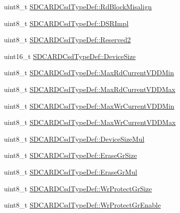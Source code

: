 \begin{DoxyCompactItemize}
\item 
uint8\-\_\-t \hyperlink{group___p_i_o_s___s_d_c_a_r_d_ga959156fe53645cd48d715f89c3407618}{\-S\-D\-C\-A\-R\-D\-Csd\-Type\-Def\-::\-Rd\-Block\-Misalign}
\item 
uint8\-\_\-t \hyperlink{group___p_i_o_s___s_d_c_a_r_d_ga650841d99b60792a21a853a6a2c541d9}{\-S\-D\-C\-A\-R\-D\-Csd\-Type\-Def\-::\-D\-S\-R\-Impl}
\item 
uint8\-\_\-t \hyperlink{group___p_i_o_s___s_d_c_a_r_d_ga2580f84971aaa12e06b546fd8b884dad}{\-S\-D\-C\-A\-R\-D\-Csd\-Type\-Def\-::\-Reserved2}
\item 
uint16\-\_\-t \hyperlink{group___p_i_o_s___s_d_c_a_r_d_ga32e9f1203e96670adc0e71599231da0f}{\-S\-D\-C\-A\-R\-D\-Csd\-Type\-Def\-::\-Device\-Size}
\item 
uint8\-\_\-t \hyperlink{group___p_i_o_s___s_d_c_a_r_d_ga44848558ce422fd005494fcb94656fa8}{\-S\-D\-C\-A\-R\-D\-Csd\-Type\-Def\-::\-Max\-Rd\-Current\-V\-D\-D\-Min}
\item 
uint8\-\_\-t \hyperlink{group___p_i_o_s___s_d_c_a_r_d_ga3ba17f2a67a38414d67aaad8d7cc99be}{\-S\-D\-C\-A\-R\-D\-Csd\-Type\-Def\-::\-Max\-Rd\-Current\-V\-D\-D\-Max}
\item 
uint8\-\_\-t \hyperlink{group___p_i_o_s___s_d_c_a_r_d_ga592f9aec07e72eed97e1f28155f23ab4}{\-S\-D\-C\-A\-R\-D\-Csd\-Type\-Def\-::\-Max\-Wr\-Current\-V\-D\-D\-Min}
\item 
uint8\-\_\-t \hyperlink{group___p_i_o_s___s_d_c_a_r_d_gab98289ea1b8bc4b5e7fee1820487c07c}{\-S\-D\-C\-A\-R\-D\-Csd\-Type\-Def\-::\-Max\-Wr\-Current\-V\-D\-D\-Max}
\item 
uint8\-\_\-t \hyperlink{group___p_i_o_s___s_d_c_a_r_d_gafcf009add5954b88bd7b13630179acd1}{\-S\-D\-C\-A\-R\-D\-Csd\-Type\-Def\-::\-Device\-Size\-Mul}
\item 
uint8\-\_\-t \hyperlink{group___p_i_o_s___s_d_c_a_r_d_ga23248a27a48bd1603990d88bc6e6825b}{\-S\-D\-C\-A\-R\-D\-Csd\-Type\-Def\-::\-Erase\-Gr\-Size}
\item 
uint8\-\_\-t \hyperlink{group___p_i_o_s___s_d_c_a_r_d_gaaba9c6de9483b08af94542e59c76107e}{\-S\-D\-C\-A\-R\-D\-Csd\-Type\-Def\-::\-Erase\-Gr\-Mul}
\item 
uint8\-\_\-t \hyperlink{group___p_i_o_s___s_d_c_a_r_d_ga6976b49fb75de7273c9ae54e5b4df865}{\-S\-D\-C\-A\-R\-D\-Csd\-Type\-Def\-::\-Wr\-Protect\-Gr\-Size}
\item 
uint8\-\_\-t \hyperlink{group___p_i_o_s___s_d_c_a_r_d_ga40ddea3e9a913588c57a8f922e929407}{\-S\-D\-C\-A\-R\-D\-Csd\-Type\-Def\-::\-Wr\-Protect\-Gr\-Enable}
\item 

\end{DoxyCompactItemize}
